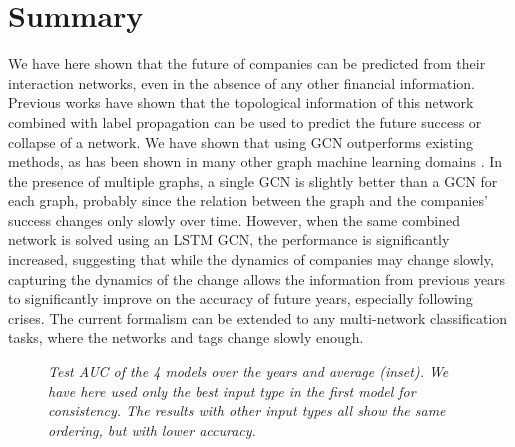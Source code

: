 \section{Summary}
We have here shown that the future of companies can be predicted from their interaction networks, even in the absence of any other financial information. Previous works have shown that the topological information of this network combined with label propagation can be used to predict the future success or collapse of a network. We have shown that using GCN outperforms existing methods, as has been shown in many other graph machine learning domains \cite{kipf2016semi}. In the presence of multiple graphs, a single GCN is slightly better than a GCN for each graph, probably since the relation between the graph and the companies' success changes only slowly over time. However, when the same combined network is solved using an LSTM GCN, the performance is significantly increased, suggesting that while the dynamics of companies may change slowly, capturing the dynamics of the change allows the information from previous years to significantly improve on the accuracy of future years, especially following crises. The current formalism can be extended to any multi-network classification tasks, where the networks and tags change slowly enough.

\begin{figure}[h!]
    \begin{center}
    \end{center}
    \caption{\textit{Test AUC of the 4 models over the years and average (inset). We have here used only the best input type in the first model for consistency. The results with other input types all show the same ordering, but with lower accuracy.}}
    \label{fig:auc_models}
\end{figure}

